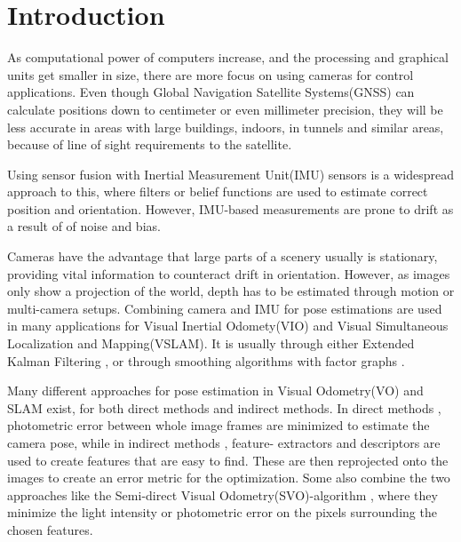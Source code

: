 
\chapter{Introduction} \label{chap:introduction}

As computational power of computers increase, and the processing and graphical units get smaller in size, there are more focus on using cameras for control applications. Even though Global Navigation Satellite Systems(GNSS) can calculate positions down to centimeter or even millimeter precision\cite{GPSaccuracy}, they will be less accurate in areas with large buildings, indoors, in tunnels and similar areas, because of line of sight requirements to the satellite. 

Using sensor fusion with Inertial Measurement Unit(IMU) sensors is a widespread approach to this, where filters or belief functions are used to estimate correct position and orientation. However, IMU-based measurements are prone to drift as a result of of noise and bias.

Cameras have the advantage that large parts of a scenery usually is stationary, providing vital information to counteract drift in orientation. However, as images only show a projection of the world, depth has to be estimated through motion or multi-camera setups. Combining camera and IMU for pose estimations are used in many applications for Visual Inertial Odomety(VIO) and Visual Simultaneous Localization and Mapping(VSLAM). It is usually through either Extended Kalman Filtering \cite{RealTimeKalmannSLAM, HighPrecKalmannVIO, OmniVIOKalman}, or through smoothing algorithms with factor graphs \cite{OnManiIntgrVIO, KeyFrameVIO}.

Many different approaches for pose estimation in Visual Odometry(VO) and SLAM exist, for both direct methods and indirect methods. In direct methods \cite{DTAMdirect, LSDSLAMdirect}, photometric error between whole image frames are minimized to estimate the camera pose, while in indirect methods \cite{ORBSLAMindirect, 2yMarsndirect}, feature- extractors and descriptors are used to create features that are easy to find. These are then reprojected onto the images to create an error metric for the optimization. Some also combine the two approaches like the Semi-direct Visual Odometry(SVO)-algorithm \cite{SVOpaper}, where they minimize the light intensity or photometric error on the pixels surrounding the chosen features.

